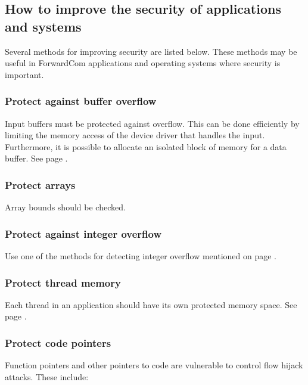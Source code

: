 \documentclass[forwardcom.tex]{subfiles}
\begin{document}
\subsection{How to improve the security of applications and systems}
Several methods for improving security are listed below. These methods may be useful in ForwardCom applications and operating systems where security is important.

\subsubsection{Protect against buffer overflow}
Input buffers must be protected against overflow. This can be done efficiently by limiting the memory access of the device driver that handles the input. Furthermore, it is possible to allocate an isolated block of memory for a data buffer. See page \pageref{isolatedMemoryBlocks}.

\subsubsection{Protect arrays} Array bounds should be checked.

\subsubsection{Protect against integer overflow} Use one of the methods for detecting integer overflow mentioned on page \pageref{integerOverflowDetection}.

\subsubsection{Protect thread memory} Each thread in an application should have its own protected memory space. See page \pageref{threadMemoryProtection}.

\subsubsection{Protect code pointers}
Function pointers and other pointers to code are vulnerable to control flow hijack attacks. These include:
\end{document}
